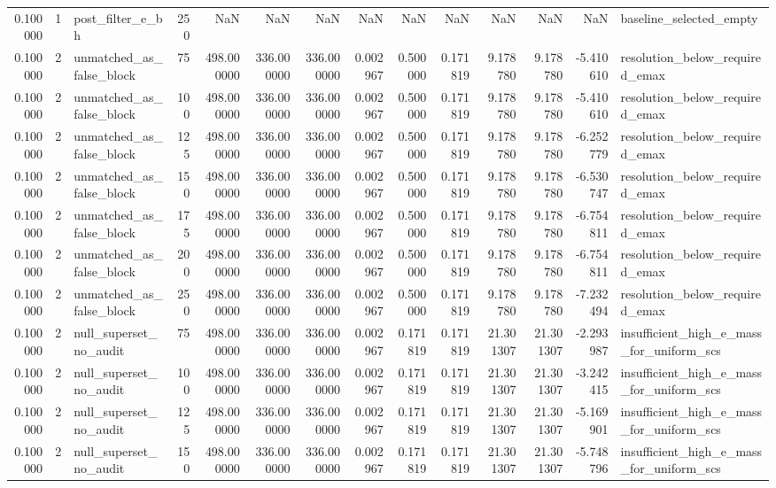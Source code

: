 \begin{tabular}{rrlrrrrrrrrrrl}
0.100000 & 1 & post_filter_e_bh & 250 & NaN & NaN & NaN & NaN & NaN & NaN & NaN & NaN & NaN & baseline_selected_empty \\
0.100000 & 2 & unmatched_as_false_block & 75 & 498.000000 & 336.000000 & 336.000000 & 0.002967 & 0.500000 & 0.171819 & 9.178780 & 9.178780 & -5.410610 & resolution_below_required_emax \\
0.100000 & 2 & unmatched_as_false_block & 100 & 498.000000 & 336.000000 & 336.000000 & 0.002967 & 0.500000 & 0.171819 & 9.178780 & 9.178780 & -5.410610 & resolution_below_required_emax \\
0.100000 & 2 & unmatched_as_false_block & 125 & 498.000000 & 336.000000 & 336.000000 & 0.002967 & 0.500000 & 0.171819 & 9.178780 & 9.178780 & -6.252779 & resolution_below_required_emax \\
0.100000 & 2 & unmatched_as_false_block & 150 & 498.000000 & 336.000000 & 336.000000 & 0.002967 & 0.500000 & 0.171819 & 9.178780 & 9.178780 & -6.530747 & resolution_below_required_emax \\
0.100000 & 2 & unmatched_as_false_block & 175 & 498.000000 & 336.000000 & 336.000000 & 0.002967 & 0.500000 & 0.171819 & 9.178780 & 9.178780 & -6.754811 & resolution_below_required_emax \\
0.100000 & 2 & unmatched_as_false_block & 200 & 498.000000 & 336.000000 & 336.000000 & 0.002967 & 0.500000 & 0.171819 & 9.178780 & 9.178780 & -6.754811 & resolution_below_required_emax \\
0.100000 & 2 & unmatched_as_false_block & 250 & 498.000000 & 336.000000 & 336.000000 & 0.002967 & 0.500000 & 0.171819 & 9.178780 & 9.178780 & -7.232494 & resolution_below_required_emax \\
0.100000 & 2 & null_superset_no_audit & 75 & 498.000000 & 336.000000 & 336.000000 & 0.002967 & 0.171819 & 0.171819 & 21.301307 & 21.301307 & -2.293987 & insufficient_high_e_mass_for_uniform_scs \\
0.100000 & 2 & null_superset_no_audit & 100 & 498.000000 & 336.000000 & 336.000000 & 0.002967 & 0.171819 & 0.171819 & 21.301307 & 21.301307 & -3.242415 & insufficient_high_e_mass_for_uniform_scs \\
0.100000 & 2 & null_superset_no_audit & 125 & 498.000000 & 336.000000 & 336.000000 & 0.002967 & 0.171819 & 0.171819 & 21.301307 & 21.301307 & -5.169901 & insufficient_high_e_mass_for_uniform_scs \\
0.100000 & 2 & null_superset_no_audit & 150 & 498.000000 & 336.000000 & 336.000000 & 0.002967 & 0.171819 & 0.171819 & 21.301307 & 21.301307 & -5.748796 & insufficient_high_e_mass_for_uniform_scs \\

\end{tabular}
